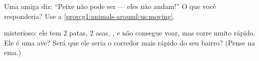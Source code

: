 \begin{exercise}[$\star\star$]\label{exo:g1:animals-around-us:9}
Uma amiga diz: ``Peixe não pode ser  --- eles não andam!'' O
que você responderia? Use a \cref{prop:g1:animals-around-us:moving}.
\end{exercise}

\begin{exercise}[$\star\star$]\label{exo:g1:animals-around-us:10}
 misterioso: ele tem $2$ patas, $2$ asas, , e não
consegue voar, mas corre muito rápido. Ele é uma ave? Será que ele
seria o corredor mais rápido do seu bairro? (Pense na ema.)
\end{exercise}
